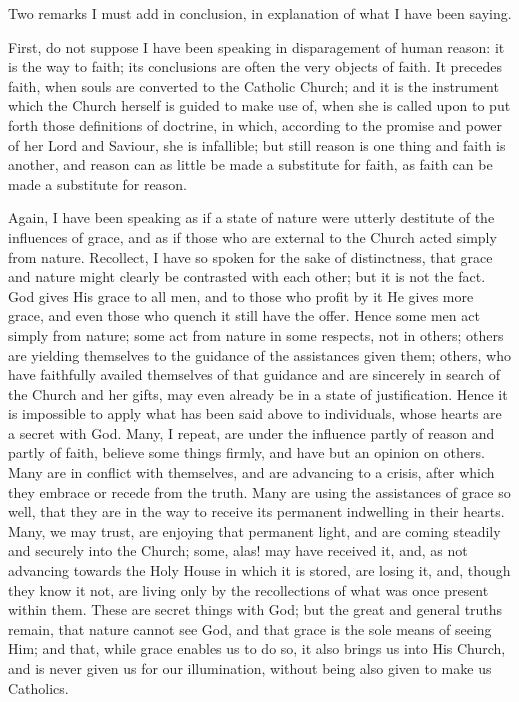 Two remarks I must add in conclusion, in explanation of what I have
been saying.

First, do not suppose I have been speaking in disparagement of
human reason: it is the way to faith; its conclusions are often the
very objects of faith. It precedes faith, when souls are converted to
the Catholic Church; and it is the instrument which the Church herself
is guided to make use of, when she is called upon to put forth those
definitions of doctrine, in which, according to the promise and power
of her Lord and Saviour, she is infallible; but still reason is one
thing and faith is another, and reason can as little be made a
substitute for faith, as faith can be made a substitute for reason.

Again, I have been speaking as if a state of nature were utterly
destitute of the influences of grace, and as if those who are external
to the Church acted simply from nature. Recollect, I have so spoken
for the sake of distinctness, that grace and nature might clearly be
contrasted with each other; but it is not the fact. God gives His
grace to all men, and to those who profit by it He gives more grace,
and even those who quench it still have the offer. Hence some men act
simply from nature; some act from nature in some respects, not in
others; others are yielding themselves to the guidance of the
assistances given them; others, who have faithfully availed themselves
of that guidance and are sincerely in search of the Church and her
gifts, may even already be in a state of justification. Hence it is
impossible to apply what has been said above to individuals, whose
hearts are a secret with God. Many, I repeat, are under the influence
partly of reason and partly of faith, believe some things firmly, and
have but an opinion on others. Many are in conflict with themselves,
and are advancing to a crisis, after which they embrace or recede from
the truth. Many are using the assistances of grace so well, that they
are in the way to receive its permanent indwelling in their hearts.
Many, we may trust, are enjoying that permanent light, and are coming
steadily and securely into the Church; some, alas! may have received
it, and, as not advancing towards the Holy House in which it is
stored, are losing it, and, though they know it not, are living only
by the recollections of what was once present within them. These are
secret things with God; but the great and general truths remain, that
nature cannot see God, and that grace is the sole means of seeing Him;
and that, while grace enables us to do so, it also brings us into His
Church, and is never given us for our illumination, without being also
given to make us Catholics.

